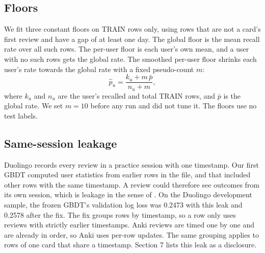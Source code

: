\subsection{Floors}
We fit three constant floors on TRAIN rows only, using rows that are not a card's first review and have a gap of at least one day.
The global floor is the mean recall rate over all such rows.
The per-user floor is each user's own mean, and a user with no such rows gets the global rate.
The smoothed per-user floor shrinks each user's rate towards the global rate with a fixed pseudo-count $m$:
\begin{equation}
  \hat p_u = \frac{k_u + m\,\bar p}{n_u + m},
\end{equation}
where $k_u$ and $n_u$ are the user's recalled and total TRAIN rows, and $\bar p$ is the global rate.
We set $m = 10$ before any run and did not tune it.
The floors use no test labels.

\subsection{Same-session leakage}
Duolingo records every review in a practice session with one timestamp.
Our first GBDT computed user statistics from earlier rows in the file, and that included other rows with the same timestamp.
A review could therefore see outcomes from its own session, which is leakage in the sense of \cite{kaufman2012leakage}.
On the Duolingo development sample, the frozen GBDT's validation log loss was 0.2473 with this leak and 0.2578 after the fix.
The fix groups rows by timestamp, so a row only uses reviews with strictly earlier timestamps.
Anki reviews are timed one by one and are already in order, so Anki uses per-row updates.
The same grouping applies to rows of one card that share a timestamp.
Section 7 lists this leak as a disclosure.
